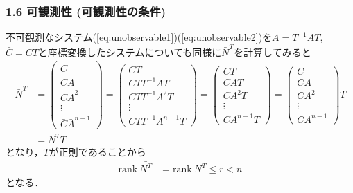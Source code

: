 \documentclass[10pt]{beamer}
\begin{document}
\begin{frame}[t]
\frametitle{1.6 可観測性 (可観測性の条件)}
不可観測なシステム(\ref{eq:unobservable1})(\ref{eq:unobservable2})を$\bar{A}= T^{-1} A T$, $\bar{C} = C T$と座標変換したシステムについても同様に$\bar{N}^T$を計算してみると
\begin{align}
 \bar{N}^T
 &=
  \left(\begin{array}{c}
     \bar{C}        \\
   \bar{C} \bar{A}      \\
   \bar{C} \bar{A}^2    \\
   \vdots   \\
   \bar{C} \bar{A}^{n-1}
  \end{array}\right)
 =
  \left(\begin{array}{c}
     CT        \\
   CT T^{-1}AT      \\
   CT T^{-1}A^2T    \\
   \vdots   \\
   CT T^{-1}A^{n-1}T
  \end{array}\right)
 =
  \left(\begin{array}{c}
     C T       \\
   C A T     \\
   C A^2 T   \\
   \vdots   \\
   C A^{n-1}T
  \end{array}\right)
 =
  \left(\begin{array}{c}
         C        \\
   C A      \\
   C A^2    \\
   \vdots   \\
   C A^{n-1}
  \end{array}\right)
  T
\nonumber \\
 &= N^T T
\end{align}
となり，$T$が正則であることから
\begin{align}
 \mbox{rank}\ \bar{N^T} & = \mbox{rank}\ {N^T} \leq r < n
\end{align}
となる．
\end{frame}
\end{document}
